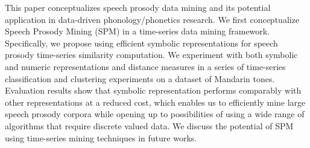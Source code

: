 This paper conceptualizes speech prosody data mining and its potential application in data-driven phonology/phonetics research.  We first conceptualize Speech Prosody Mining (SPM) in a time-series data mining framework. Specifically, we propose using efficient symbolic representations for speech prosody time-series similarity computation. We experiment with both symbolic and numeric representations and distance measures in a series of time-series classification and clustering experiments on a dataset of Mandarin tones. Evaluation results show that symbolic representation performs comparably with other representations at a reduced cost, which enables us to efficiently mine large speech prosody corpora while opening up to possibilities of using a wide range of algorithms that require discrete valued data. We discuss the potential of SPM using time-series mining techniques in future works.
